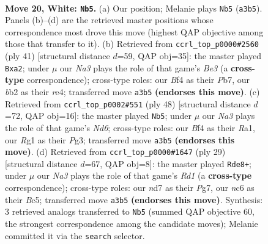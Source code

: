 \documentclass[11pt]{article}
\begin{document}
\clearpage

\begin{figure}[p]\centering
\begin{subfigure}{0.46\textwidth}\centering
\resizebox{\linewidth}{!}{%
\newchessgame
\chessboard[
  setfen={2k3r1/1ppnp2p/2n3p1/p7/5B1P/N4P2/PbP1KP2/R5R1 w - - 0 20},
  showmover=false,
  pgfstyle=straightmove, color=movearrow, markmove={a3-b5}
]}
\caption{}
\end{subfigure}\hfill
\begin{subfigure}{0.46\textwidth}\centering
\resizebox{\linewidth}{!}{%
\newchessgame
\chessboard[
  setfen={r2r2k1/1p3ppp/4b3/1P6/4R3/5N2/PP3PPP/R5K1 b - - 0 21},
  showmover=false,
  pgfstyle=straightmove, color=movearrow, markmove={e6-a2}
]}
\caption{}
\end{subfigure}
\\[4pt]
\begin{subfigure}{0.46\textwidth}\centering
\resizebox{\linewidth}{!}{%
\newchessgame
\chessboard[
  setfen={r4k2/p2r1pp1/1p1N1n1p/4p3/1P6/6P1/1P2PP1P/R2R2K1 w - - 1 25},
  showmover=false,
  pgfstyle=straightmove, color=movearrow, markmove={d6-b5}
]}
\caption{}
\end{subfigure}\hfill
\begin{subfigure}{0.46\textwidth}\centering
\resizebox{\linewidth}{!}{%
\newchessgame
\chessboard[
  setfen={2kr3r/ppp2ppp/8/2b3B1/6n1/3P1N2/PPP1KPPP/R6R b - - 1 15},
  showmover=false,
  pgfstyle=straightmove, color=movearrow, markmove={d8-e8}
]}
\caption{}
\end{subfigure}
\caption{\textbf{Move 20, White: \texttt{Nb5}.} (a) Our position; Melanie plays \texttt{Nb5} (\texttt{a3b5}). Panels (b)--(d) are the retrieved master positions whose correspondence most drove this move (highest QAP objective among those that transfer to it). (b) Retrieved from \texttt{ccrl\_top\_p0000\#2560} (ply 41) [structural distance $d$=59, QAP obj=35]: the master played \texttt{Bxa2}; under $\mu$ our \emph{Na3} plays the role of that game's \emph{Be3} (a \textbf{cross-type} correspondence); cross-type roles: our \emph{B}f4 as their \emph{P}b7, our \emph{b}b2 as their \emph{r}e4; transferred move \texttt{a3b5} \textbf{(endorses this move)}. (c) Retrieved from \texttt{ccrl\_top\_p0002\#551} (ply 48) [structural distance $d$=72, QAP obj=16]: the master played \texttt{Nb5}; under $\mu$ our \emph{Na3} plays the role of that game's \emph{Nd6}; cross-type roles: our \emph{B}f4 as their \emph{R}a1, our \emph{R}g1 as their \emph{P}g3; transferred move \texttt{a3b5} \textbf{(endorses this move)}. (d) Retrieved from \texttt{ccrl\_top\_p0000\#1647} (ply 29) [structural distance $d$=67, QAP obj=8]: the master played \texttt{Rde8+}; under $\mu$ our \emph{Na3} plays the role of that game's \emph{Rd1} (a \textbf{cross-type} correspondence); cross-type roles: our \emph{n}d7 as their \emph{P}g7, our \emph{n}c6 as their \emph{B}c5; transferred move \texttt{a3b5} \textbf{(endorses this move)}. Synthesis: 3 retrieved analogs transferred to \texttt{Nb5} (summed QAP objective 60, the strongest correspondence among the candidate moves); Melanie committed it via the \texttt{search} selector.}
\label{fig:thought-m38}
\end{figure}
\end{document}
